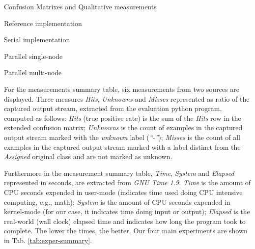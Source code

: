 \begin{table}[htb]
\caption{Confusion Matrixes and Qualitative measurements}
\label{tab:confusion-matrixes-ref-serial}
    \caption{Reference implementation}
    
    \label{tab:java-matrix}
    \vspace{5mm}
    \caption{Serial implementation}
    
    \label{tab:libc-matrix}
    \vspace{5mm}
  \caption{Parallel single-node}
  
  \label{tab:single-node-matrix}
  \caption{Parallel multi-node}
  
  \label{tab:multi-node-matrix}
\end{table}

For the measurements summary table, six measurements from two sources are displayed. Three
measures \emph{Hits}, \emph{Unknowns} and \emph{Misses} represented as ratio of
the captured output stream, extracted from the evaluation python program,
computed as follows:
\emph{Hits} (true positive rate) is the sum of the \emph{Hits} row in the
extended confusion matrix;
\emph{Unknowns} is the count of examples in the captured output stream marked
with the \emph{unknown} label (\emph{``-''});
\emph{Misses} is the count of all examples in the captured output stream marked
with a label distinct from the \emph{Assigned} original class and are not marked
as unknown.

Furthermore in the measurement summary table, \emph{Time}, \emph{System} and \emph{Elapsed}
 represented in seconds, are extracted from \emph{GNU Time 1.9}.
\emph{Time} is the amount of CPU seconds expended in user-mode
(indicates time used doing CPU intensive computing, e.g., math);
\emph{System} is the amount of CPU seconds expended in kernel-mode
(for our case, it indicates time doing input or output);
\emph{Elapsed} is the real-world (wall clock) elapsed time and
indicates how long the program took to complete.
The lower the times, the better.
Our four main experiments are shown in Tab. \ref{tab:exper-summary}.

